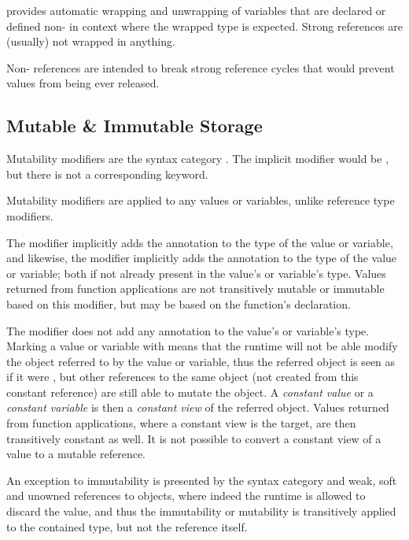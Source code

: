 \Aml provides automatic wrapping and unwrapping of variables that are declared or defined non- in context where the wrapped type is expected. Strong references are (usually) not wrapped in anything. 

Non- references are intended to break strong reference cycles that would prevent values from being ever released. 





\subsection{Mutable \& Immutable Storage}
\label{sec:mutable-immutable-storage}

Mutability modifiers are the syntax category . The implicit modifier would be , but there is not a corresponding keyword. 

Mutability modifiers are applied to any values or variables, unlike reference type modifiers. 

The  modifier implicitly adds the  annotation to the type of the value or variable, and likewise, the  modifier implicitly adds the  annotation to the type of the value or variable; both if not already present in the value's or variable's type. Values returned from function applications are not transitively mutable or immutable based on this modifier, but may be based on the function's declaration. 

The  modifier does not add any annotation to the value's or variable's type. Marking a value or variable with  means that the runtime will not be able modify the object referred to by the value or variable, thus the referred object is seen as if it were , but other references to the same object (not created from this constant reference) are still able to mutate the object. A {\em constant value} or a {\em constant variable} is then a {\em constant view} of the referred object. Values returned from function applications, where a constant view is the target, are then transitively constant as well. It is not possible to convert a constant view of a value to a mutable reference. 

An exception to immutability is presented by the  syntax category and weak, soft and unowned references to objects, where indeed the runtime is allowed to discard the value, and thus the immutability or mutability is transitively applied to the contained type, but not the reference itself. 






